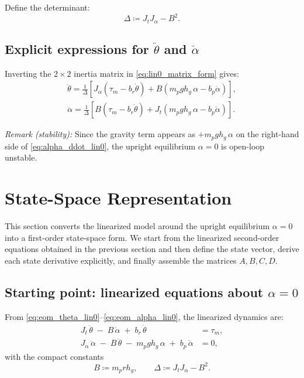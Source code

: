 \documentclass[12pt,a4paper]{article}
\begin{document}
Define the determinant:
\[
\Delta \coloneqq J_tJ_\alpha - B^2.
\]

\subsection{Explicit expressions for $\ddot\theta$ and $\ddot\alpha$}

Inverting the $2\times2$ inertia matrix in \eqref{eq:lin0_matrix_form} gives:
\begin{align}
\boxed{
\ddot\theta
=
\frac{1}{\Delta}
\left[
J_\alpha\left(\tau_m-b_r\dot\theta\right)
+
B\left(m_p g h_g\,\alpha-b_p\dot\alpha\right)
\right],
}
\label{eq:theta_ddot_lin0}\\[6pt]
\boxed{
\ddot\alpha
=
\frac{1}{\Delta}
\left[
B\left(\tau_m-b_r\dot\theta\right)
+
J_t\left(m_p g h_g\,\alpha-b_p\dot\alpha\right)
\right].
}
\label{eq:alpha_ddot_lin0}
\end{align}

\noindent\textit{Remark (stability):}
Since the gravity term appears as $+m_p g h_g\,\alpha$ on the right-hand side of
\eqref{eq:alpha_ddot_lin0}, the upright equilibrium $\alpha=0$ is open-loop unstable.



\section{State-Space Representation}

This section converts the linearized model around the upright equilibrium $\alpha=0$ into a first-order state-space form. We start from the linearized second-order equations obtained in the previous section and then define the state vector, derive each state derivative explicitly, and finally assemble the matrices $A,B,C,D$.

\subsection{Starting point: linearized equations about $\alpha=0$}

From \eqref{eq:eom_theta_lin0}--\eqref{eq:eom_alpha_lin0}, the linearized dynamics are:
\begin{align}
J_t\,\ddot\theta \;-\; B\,\ddot\alpha \;+\; b_r\,\dot\theta &= \tau_m,
\label{eq:lin0_theta_2nd}\\
J_\alpha\,\ddot\alpha \;-\; B\,\ddot\theta \;-\; m_p g h_g\,\alpha \;+\; b_p\,\dot\alpha &= 0,
\label{eq:lin0_alpha_2nd}
\end{align}
with the compact constants
\[
B \coloneqq m_p r h_g,
\qquad
\Delta \coloneqq J_t J_\alpha - B^2.
\]
\end{document}
